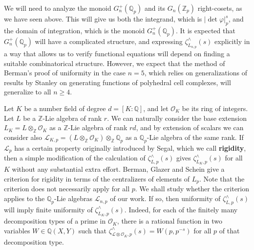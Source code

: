 \documentclass[12pt]{article}
\begin{document}
We will need to analyze the monoid $G_{n}^{+}(\mathbb{Q}_p)$ and its $G_{n}(\mathbb{Z}_p)$ right-cosets, as we have seen above. This will give us both the integrand, which is $|\det\varphi|_{p}^{s}$, and the domain of integration, which is the monoid $G_{n}^{+}(\mathbb{Q}_p)$. It is expected that $G_{n}^{+}(\mathbb{Q}_{p})$ will have a complicated structure, and expressing $\zeta_{L_{n,p}}^{\wedge}(s)$ explicitly in a way that allows us to verify functional equations will depend on finding a suitable combinatorical structure. However, we expect that the method of Berman's proof of uniformity in the case $n=5$, which relies on generalizations of results by Stanley on generating functions of polyhedral cell complexes, will generalize to all $n\geq{4}$.

Let $K$ be a number field of degree $d=[K:\mathbb{Q}]$, and let $\mathcal{O}_K$ be its ring of integers. Let $L$ be a $\mathbb{Z}$-Lie algebra of rank $r$. We can naturally consider the base extension $L_{K}=L\otimes_{\mathbb{Z}}\mathcal{O}_{K}$ as a $\mathbb{Z}$-Lie algebra of rank $rd$, and by extension of scalars we can consider also $\mathcal{L}_{K,p}=(L\otimes_{\mathbb{Z}}\mathcal{O}_K)\otimes_{\mathbb{Z}}\mathbb{Q}_p$ as a $\mathbb{Q}_p$-Lie algebra of the same rank. If $\mathcal{L}_{p}$ has a certain property originally introduced by Segal, which we call \textbf{rigidity}, then a simple modification of the calculation of $\zeta_{L,p}^{\wedge}(s)$ gives $\zeta_{L_{K},p}^{\wedge}(s)$ for all $K$ without any substantial extra effort. Berman, Glazer and Schein \cite{BermanGlazerSchein} give a criterion for rigidity in terms of the centralizers of elements of $L_{p}$. Note that the criterion does not necessarily apply for all $p$. We shall study whether the criterion applies to the $\mathbb{Q}_p$-Lie algebras $\mathcal{L}_{n,p}$ of our work. If so, then uniformity of $\zeta_{L,p}^{\wedge}(s)$ will imply finite uniformity of $\zeta_{L_{K},p}^{\wedge}(s)$. Indeed, for each of the finitely many decomposition types of a prime in $\mathcal{O}_K$, there is a rational function in two variables $W\in\mathbb{Q}(X,Y)$ such that $\zeta_{\mathcal{L}\otimes\mathcal{O}_K,p}^{\wedge}(s)=W(p,p^{-s})$ for all $p$ of that decomposition type.
\end{document}
